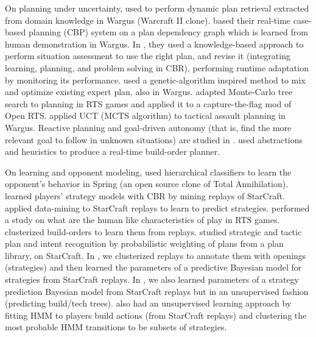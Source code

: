 On planning under uncertainty, \citet{LTW} used  to perform dynamic plan retrieval extracted from domain knowledge in Wargus (Warcraft II clone). \citet{Ontanon2007} based their real-time case-based planning (CBP) system on a plan dependency graph which is learned from human demonstration in Wargus. In \citep{Mishra2008,Ontanon2010,metalevelbehavioradaptrts}, they used a knowledge-based approach to perform situation assessment to use the right plan, and revise it (integrating learning, planning, and problem solving in CBR), performing runtime adaptation by monitoring its performance. \citet{Trusty2011} used a genetic-algorithm inspired method to mix and optimize existing expert plan, also in Wargus. \citet{Chung05} adapted Monte-Carlo tree search to planning in RTS games and applied it to a capture-the-flag mod of Open RTS. \citet{UCT} applied UCT (MCTS algorithm) to tactical assault planning in Wargus. Reactive planning and goal-driven autonomy (that is, find the more relevant goal to follow in unknown situations) are studied in \citep{Weber2010cr,WeberCIG10}. \citet{Churchill2011} used abstractions and heuristics to produce a real-time build-order planner. %

On learning and opponent modeling, \citet{schadd2007opponent} used hierarchical classifiers to learn the opponent's behavior in Spring (an open source clone of Total Annihilation). \citet{HsiehS08} learned players' strategy models with CBR by mining replays of StarCraft. \citet{weberStrat} applied data-mining to StarCraft replays to learn to predict strategies. \citet{HagelbackCIG10} performed a study on what are the human like characteristics of play in RTS games. \citet{Kim2010} clusterized build-orders to learn them from replays. \citet{Kabanza2010} studied strategic and tactic plan and intent recognition by probabilistic weighting of plans from a plan library, on StarCraft. In \citep{SYNNAEVE:OpeningPred}, we clusterized replays to annotate them with openings (strategies) and then learned the parameters of a predictive Bayesian model for strategies from StarCraft replays. In \citep{SYNNAEVE:StratPred}, we also learned parameters of a strategy prediction Bayesian model from StarCraft replays but in an unsupervised fashion (predicting build/tech trees). \citet{HMMstrat_RTS_AIIDE11} also had an unsupervised learning approach by fitting HMM to players build actions (from StarCraft replays) and clustering the most probable HMM transitions to be subsets of strategies.

